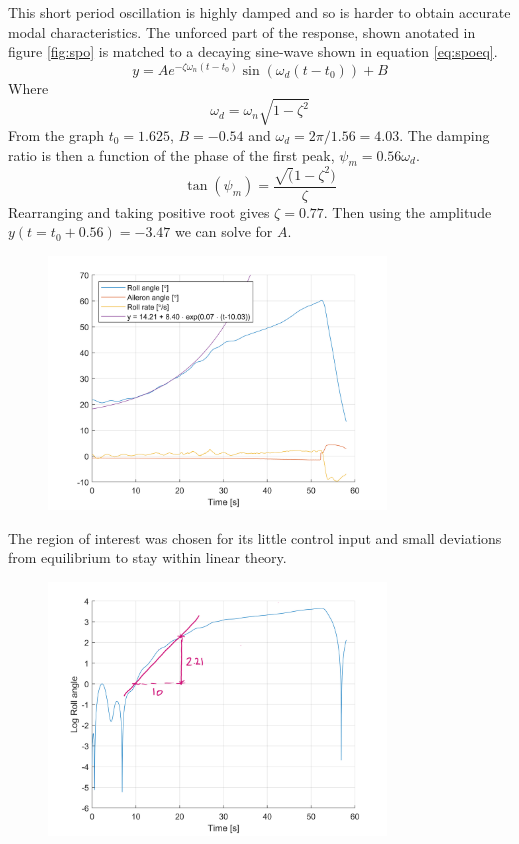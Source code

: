 \documentclass{article}
\begin{document}
This short period oscillation is highly damped and so is harder to obtain accurate modal characteristics.
The unforced part of the response, shown anotated in figure \ref{fig:spo} is matched to a decaying sine-wave shown in equation \ref{eq:spoeq}.
\begin{equation}
  y = Ae^{-\zeta\omega_{n}(t - t_{0})}\sin(\omega_{d}(t - t_{0})) + B
\end{equation}
Where
\begin{equation}
  \omega_{d} = \omega_{n}\sqrt{1 - \zeta^{2}}
\end{equation}
From the graph $t_0 = 1.625$, $B=-0.54$ and $\omega_d = 2\pi/1.56 = 4.03$.
The damping ratio is then a function of the phase of the first peak, $\psi_m = 0.56\omega_d$.
\begin{equation}
  \tan(\psi_m) = \frac{\sqrt(1-\zeta^2)}{\zeta}
\end{equation}
Rearranging and taking positive root gives $\zeta= 0.77$.
Then using the amplitude $y(t=t_0 + 0.56) = -3.47$ we can solve for $A$.


\begin{figure}[H]
  \centering
  \includegraphics[width=0.8\textwidth]{figures/Spiral.png}
  \caption{}
  \label{fig:spiral}
\end{figure}

The region of interest was chosen for its little control input and small deviations from equilibrium to stay within linear theory.

\begin{figure}[H]
  \centering
  \includegraphics[width=0.8\textwidth]{figures/anSpiral_log.png}
  \caption{}
  \label{fig:spiral_log}
\end{figure}
\end{document}
